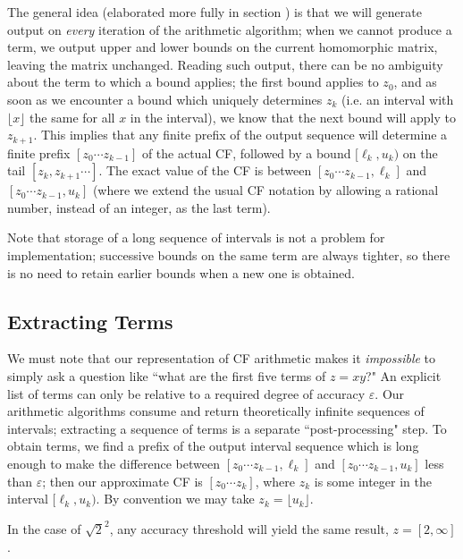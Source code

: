 \documentclass[11pt, oneside]{amsart}   	%
\begin{document}
The general idea (elaborated more fully in section \label{sec:finalAlgorithm}) is that we will generate output on \emph{every} iteration of the arithmetic algorithm; when we cannot produce a term, we output upper and lower bounds on the current homomorphic matrix, leaving the matrix unchanged. Reading such output, there can be no ambiguity about the term to which a bound applies; the first bound applies to $z_0$, and as soon as we encounter a bound which uniquely determines $z_k$ (i.e. an interval with $\lfloor x \rfloor$ the same for all $x$ in the interval), we know that the next bound will apply to $z_{k+1}$. This implies that any finite prefix of the output sequence will determine a finite prefix $[z_0 \cdots z_{k-1}]$ of the actual CF, followed by a bound $[\ell_k,u_k)$ on the tail $[z_k, z_{k+1}\cdots]$. The exact value of the CF is between $[z_0 \cdots z_{k-1}, \ell_k]$ and $[z_0 \cdots z_{k-1}, u_k]$ (where we extend the usual CF notation by allowing a rational number, instead of an integer, as the last term).

Note that storage of a long sequence of intervals is not a problem for implementation; successive bounds on the same term are always tighter, so there is no need to retain earlier bounds when a new one is obtained. 

\subsection{Extracting Terms}
We must note that our representation of CF arithmetic makes it \emph{impossible} to simply ask a question like ``what are the first five terms of $z = xy$?" An explicit list of terms can only be relative to a required degree of accuracy $\varepsilon$. Our arithmetic algorithms consume and return theoretically infinite sequences of intervals; extracting a sequence of terms is a separate ``post-processing" step. To obtain terms, we find a prefix of the output interval sequence which is long enough to make the difference between $[z_0 \cdots z_{k-1}, \ell_k]$ and $[z_0 \cdots z_{k-1}, u_k]$ less than $\varepsilon$; then our approximate CF is $[z_0 \cdots z_k]$, where $z_k$ is some integer in the interval $[\ell_k,u_k)$. By convention we may take $z_k = \lfloor u_k \rfloor$. 

In the case of $\sqrt{2}^2$, any accuracy threshold will yield the same result, $z = [2,\infty]$.
\end{document}

